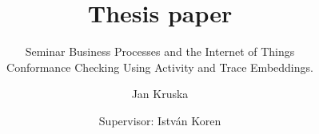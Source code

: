 \documentclass[runningheads]{template/llncs}
\begin{document}
%
\title{Thesis paper}
\subtitle{Seminar Business Processes and the Internet of Things \\ Conformance Checking Using Activity and Trace Embeddings.}
%
%
\author{Jan Kruska \and Supervisor: István Koren}
%
%
%
\maketitle              %
%
\begin{abstract}
\end{abstract}
%
%
%
\end{document}
